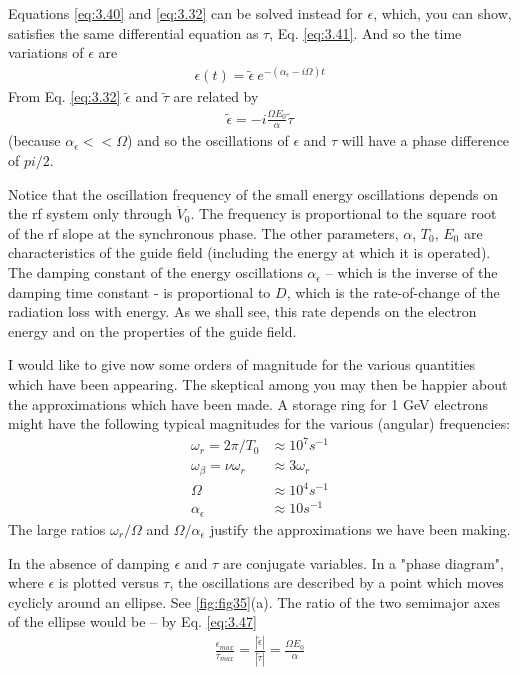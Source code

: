 Equations \eqref{eq:3.40} and \eqref{eq:3.32} can be solved instead for $\epsilon$, which, you can show, satisfies the same differential equation as $\tau$, Eq. \eqref{eq:3.41}. And so the time variations of $\epsilon$ are
\begin{align}
	\epsilon(t) = \tilde{\epsilon}\ e^{-(\alpha_\epsilon - i\Omega)t}
\end{align}
From Eq. \eqref{eq:3.32} $\tilde{\epsilon}$ and $\tilde{\tau}$ are related by
\begin{align}
	\tilde{\epsilon} = -i\frac{\Omega E_0}{\alpha}\tilde{\tau}\label{eq:3.47}
\end{align}
(because $\alpha_\epsilon << \Omega$) and so the oscillations of $\epsilon$ and $\tau$ will have a phase difference of $pi/2$.

Notice that the oscillation frequency of the small energy oscillations depends on the rf system only through $\dot{V}_0$. The frequency is proportional to the square root of the rf slope at the synchronous phase. The other parameters, $\alpha$, $T_0$, $E_0$ are characteristics of the guide field (including the energy at which it is operated). The damping constant of the energy oscillations $\alpha_\epsilon$ -- which is the inverse of the damping time constant - is proportional to $D$, which is the rate-of-change of the radiation loss with energy. As we shall see, this rate depends on the electron energy and on the properties of the guide field.

I would like to give now some orders of magnitude for the various quantities which have been appearing. The skeptical among you may then be happier about the approximations which have been made. A storage ring for 1 GeV electrons might have the following typical magnitudes for the various (angular) frequencies:
\begin{align*}
	\omega_r = 2\pi /T_0 &\approx 10^7 s^{-1}\\
	\omega_\beta = \nu \omega_r &\approx 3\omega_r\\
	\Omega &\approx 10^4 s^{-1}\\
	\alpha_\epsilon &\approx 10 s^{-1}
\end{align*}
The large ratios $\omega_r/\Omega$ and $\Omega/\alpha_\epsilon$ justify the approximations we have been making.

In the absence of damping $\epsilon$ and $\tau$ are conjugate variables. In a "phase diagram", where $\epsilon$ is plotted versus $\tau$, the oscillations are described by a point which moves cyclicly around an ellipse. See \autoref{fig:fig35}(a). The ratio of the two semimajor axes of the ellipse would be -- by Eq. \eqref{eq:3.47}
\begin{align}
	\frac{\epsilon_{max}}{\tau_{max}} = \frac{|\tilde{\epsilon}|}{|\tilde{\tau}|} = \frac{\Omega E_0}{\alpha}
\end{align} 

